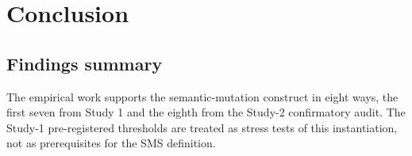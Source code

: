 \documentclass[manuscript,screen,review]{acmart}
\begin{document}


\section{Conclusion}\label{conclusion}

\subsection{Findings summary}\label{findings-summary}

The empirical work supports the semantic-mutation construct in eight
ways, the first seven from Study 1 and the eighth from the Study-2
confirmatory audit. The Study-1 pre-registered thresholds are treated as
stress tests of this instantiation, not as prerequisites for the SMS
definition.
\end{document}
